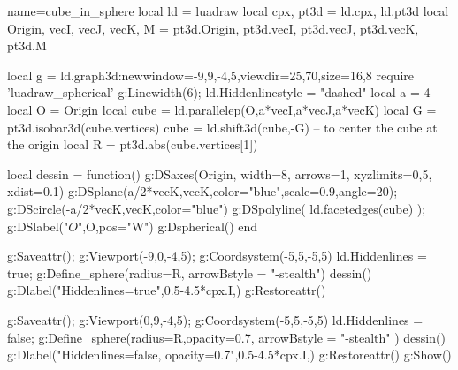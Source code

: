 \begin{luadraw}{name=cube_in_sphere}
local ld = luadraw
local cpx, pt3d = ld.cpx, ld.pt3d
local Origin, vecI, vecJ, vecK, M = pt3d.Origin, pt3d.vecI, pt3d.vecJ, pt3d.vecK, pt3d.M

local g = ld.graph3d:new{window={-9,9,-4,5},viewdir={25,70},size={16,8}}
require 'luadraw_spherical'
g:Linewidth(6); ld.Hiddenlinestyle = "dashed"
local a = 4
local O = Origin
local cube = ld.parallelep(O,a*vecI,a*vecJ,a*vecK)
local G = pt3d.isobar3d(cube.vertices)
cube = ld.shift3d(cube,-G) -- to center the cube at the origin
local R = pt3d.abs(cube.vertices[1])

local dessin = function()
    g:DSaxes(Origin, {width=8, arrows=1, xyzlimits={0,5}, xdist=0.1})
    g:DSplane({a/2*vecK,vecK},{color="blue",scale=0.9,angle=20}); 
    g:DScircle({-a/2*vecK,vecK},{color="blue"})
    g:DSpolyline( ld.facetedges(cube) ); g:DSlabel("$O$",O,{pos="W"})
    g:Dspherical()
end

g:Saveattr(); g:Viewport(-9,0,-4,5); g:Coordsystem(-5,5,-5,5)
ld.Hiddenlines = true; g:Define_sphere({radius=R, arrowBstyle = "-stealth"})
dessin()
g:Dlabel("Hiddenlines=true",0.5-4.5*cpx.I,{})
g:Restoreattr()

g:Saveattr(); g:Viewport(0,9,-4,5); g:Coordsystem(-5,5,-5,5)
ld.Hiddenlines = false; g:Define_sphere({radius=R,opacity=0.7, arrowBstyle = "-stealth"} )
dessin()
g:Dlabel("Hiddenlines=false, opacity=0.7",0.5-4.5*cpx.I,{})
g:Restoreattr()
g:Show()
\end{luadraw}
